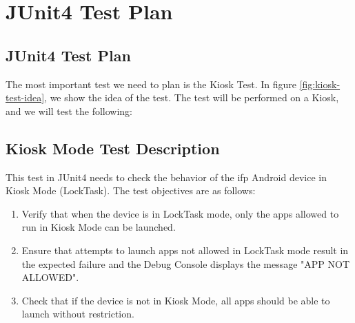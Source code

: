   {\color{teal!90}\chapter{JUnit4 Test Plan}\label{cap:junit4-test-plan}}


  \minitoc%

  \section{JUnit4 Test Plan}

  The most important test we need to plan is the Kiosk Test. In figure \ref{fig:kiosk-test-idea}, we show the idea of the test. The test will be performed on a Kiosk, and we will test the following:

  \section{Kiosk Mode Test Description}

  This test in JUnit4 needs to check the behavior of the \gls{ifp} Android device in Kiosk Mode (LockTask). The test objectives are as follows:

  \begin{enumerate}
    \item Verify that when the device is in LockTask mode, only the apps allowed to run in Kiosk Mode can be launched.
    \item Ensure that attempts to launch apps not allowed in LockTask mode result in the expected failure and the Debug Console displays the message "APP NOT ALLOWED".
    \item Check that if the device is not in Kiosk Mode, all apps should be able to launch without restriction.
  \end{enumerate}

